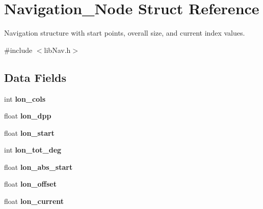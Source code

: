 \hypertarget{structNavigation__Node}{\section{Navigation\-\_\-\-Node Struct Reference}
\label{structNavigation__Node}
}


Navigation structure with start points, overall size, and current index values.  




{\ttfamily \#include $<$lib\-Nav.\-h$>$}

\subsection*{Data Fields}
\begin{DoxyCompactItemize}
\item 
\hypertarget{structNavigation__Node_a6520a131effe5308becfddb288b0d19e}{int {\bfseries lon\-\_\-cols}}\label{structNavigation__Node_a6520a131effe5308becfddb288b0d19e}

\item 
\hypertarget{structNavigation__Node_a88f0e1c482d126e8d97d1caf945dd420}{float {\bfseries lon\-\_\-dpp}}\label{structNavigation__Node_a88f0e1c482d126e8d97d1caf945dd420}

\item 
\hypertarget{structNavigation__Node_a2d94f896d3e72975cd72fa9d0ff0b4e8}{float {\bfseries lon\-\_\-start}}\label{structNavigation__Node_a2d94f896d3e72975cd72fa9d0ff0b4e8}

\item 
\hypertarget{structNavigation__Node_a51233de3e050b595de21b7e3056c33c3}{int {\bfseries lon\-\_\-tot\-\_\-deg}}\label{structNavigation__Node_a51233de3e050b595de21b7e3056c33c3}

\item 
\hypertarget{structNavigation__Node_a068078b9590129d45116039976de5e08}{float {\bfseries lon\-\_\-abs\-\_\-start}}\label{structNavigation__Node_a068078b9590129d45116039976de5e08}

\item 
\hypertarget{structNavigation__Node_a44e00ebc6507634648ead4a0970e1bb8}{float {\bfseries lon\-\_\-offset}}\label{structNavigation__Node_a44e00ebc6507634648ead4a0970e1bb8}

\item 
\hypertarget{structNavigation__Node_aac6596efbc5911c30e5cc325bfc4dfd3}{float {\bfseries lon\-\_\-current}}\label{structNavigation__Node_aac6596efbc5911c30e5cc325bfc4dfd3}


\end{DoxyCompactItemize}
